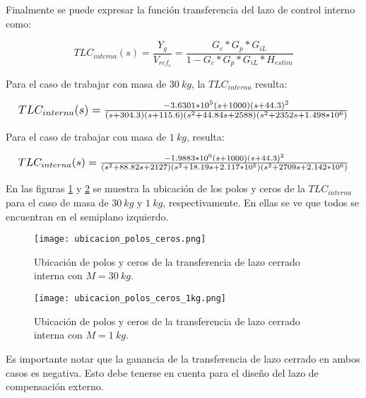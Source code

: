 Finalmente se puede expresar la función transferencia del lazo de control interno como:
%


\begin{equation}
	TLC_{interna}(s)=\frac{Y_g}{V_{ref_c}}=\frac{G_c*G_{p}*G_{iL}}{1-G_c*G_{p}*G_{iL}*H_{estim}}
\end{equation}

Para el caso de trabajar con masa de $30\:kg$, la $TLC_{interna}$ resulta:

\begin{equation*}
	\resizebox{.99\hsize}{!}
	{
		$
		TLC_{interna}(s)=\frac{-3.6301*10^5(s+1000)(s+44.3)^2}{(s+304.3) (s+115.6) (s^2 + 44.84s + 2588) (s^2 + 2352s + 1.498*10^6)}
		$
	}
\end{equation*}


Para el caso de trabajar con masa de $1\:kg$, resulta:


\begin{equation*}
	\resizebox{.99\hsize}{!}
	{
		$
		TLC_{interna}(s)=\frac{-1.9883*10^6 (s+1000) (s+44.3)^2}{(s^2 + 88.82s + 2127) (s^2 + 18.19s + 2.117*10^5) (s^2 + 2709s + 2.142*10^6)}	
		$
	}
\end{equation*}



En las figuras \ref{fig:ubicacion_polos_y_ceros} y \ref{fig:ubicacion_polos_y_ceros_1kg} se muestra la ubicación de los polos y ceros de la $TLC_{interna}$ para el caso de masa de $30\:kg$ y $1\:kg$, respectivamente. En ellas se ve que todos se encuentran en el semiplano izquierdo. 

\begin{figure}[H]
	\centering
	\texttt{[image: ubicacion\_polos\_ceros.png]}
	\caption{Ubicación de polos y ceros de la transferencia de lazo cerrado interna con $M=30\:kg$.}
	\label{fig:ubicacion_polos_y_ceros}
\end{figure}

\begin{figure}[H]
	\centering
	\texttt{[image: ubicacion\_polos\_ceros\_1kg.png]}
	\caption{Ubicación de polos y ceros de la transferencia de lazo cerrado interna con $M=1\:kg$.}
	\label{fig:ubicacion_polos_y_ceros_1kg}
\end{figure}


Es importante notar que la ganancia de la transferencia de lazo cerrado en ambos casos es negativa. Esto debe tenerse en cuenta para el diseño del lazo de compensación externo.


